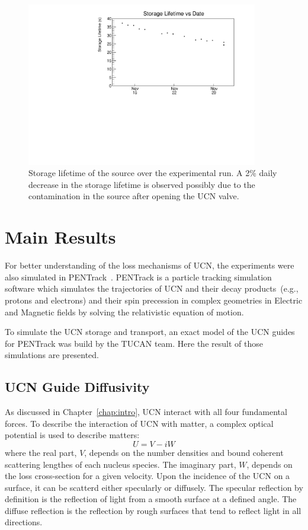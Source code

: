 \begin{figure}[h!]
  \centering
  \includegraphics[width=0.9\textwidth]{storageLifetime_vs_time.pdf}
  \caption{Storage lifetime of the source over the experimental run. A
    2\% daily decrease in the storage lifetime is observed possibly
    due to the contamination in the source after opening the UCN
    valve.}
  \label{fig:storagelifetime_overall}
\end{figure}



\section{Main Results\label{sec:pentrack}}

For better understanding of the loss mechanisms of UCN, the
experiments were also simulated in
PENTrack~\cite{schreyer2017pentrack}. PENTrack is a particle tracking
simulation software which simulates the trajectories of UCN and their
decay products~(e.g., protons and electrons) and their spin precession
in complex geometries in Electric and Magnetic fields by solving the
relativistic equation of motion.

To simulate the UCN storage and transport, an exact model of the UCN
guides for PENTrack was build by the TUCAN team. Here the result of
those simulations are presented.
\subsection{UCN Guide Diffusivity\label{sec:diffusivity}}
As discussed in Chapter~\ref{chap:intro}, UCN interact with all four
fundamental forces. To describe the interaction of UCN with matter, a
complex optical potential is used to describe matters:
\begin{equation}
  \label{eqn:fermipotential}
  U = V - iW
\end{equation}
where the real part, $V$, depends on the number densities and bound
coherent scattering lengthes of each nucleus species. The imaginary
part, $W$, depends on the loss cross-section for a given velocity.
Upon the incidence of the UCN on a surface, it can be scatterd either
specularly or diffusely. The specular reflection by definition is the
reflection of light from a smooth surface at a defined angle. The
diffuse reflection is the reflection by rough surfaces that tend to
reflect light in all directions.


